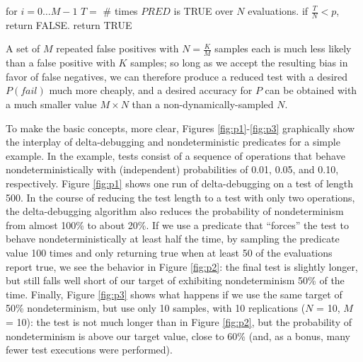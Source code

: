 {\scriptsize
\begin{code}
for $i = 0 \ldots M-1$
   $T =$ \# times $\mathit{PRED}$ is TRUE over $N$ evaluations.
   if $\frac{T}{N} < p$, return FALSE.
return TRUE
\end{code}
}

A set of $M$ repeated false positives with
$N = \frac{K}{M}$ samples each is much less likely than a false positive
with $K$ samples; so long as we accept the resulting bias in favor of
false negatives, we can therefore produce a reduced test with a
desired $P(\mathit{fail})$ much more cheaply, and a
desired accuracy for $P$ can be obtained with a much smaller value $M
\times N$ than a non-dynamically-sampled $N$.

To make the basic concepts, more clear, Figures
\ref{fig:p1}-\ref{fig:p3} graphically show the interplay of
delta-debugging and nondeterministic predicates for a simple example.
In the example, tests consist of a sequence of operations that behave
nondeterministically with (independent) probabilities of 0.01, 0.05,
and 0.10, respectively.  Figure \ref{fig:p1} shows one run of
delta-debugging on a test of length 500.  In
the course of reducing the test length to a test with only two
operations, the delta-debugging algorithm also reduces the probability
of nondeterminism from almost 100\% to about 20\%.  If we use a predicate that
``forces'' the test to behave nondeterministically at least half the
time, by sampling the predicate value 100 times and only returning
true when at least 50 of the evaluations report true, we see the
behavior in Figure \ref{fig:p2}:  the final test is slightly longer,
but still falls well short of our target of exhibiting nondeterminism
50\% of the time.  Finally, Figure \ref{fig:p3} shows what happens if
we use the same target of 50\% nondeterminism, but use only 10
samples, with 10 replications ($N$ = 10, $M$ = 10):  the test is not
much longer than in Figure \ref{fig:p2}, but the probability of
nondeterminism is above our target value, close to 60\% (and, as a bonus, many fewer
test executions were performed).  